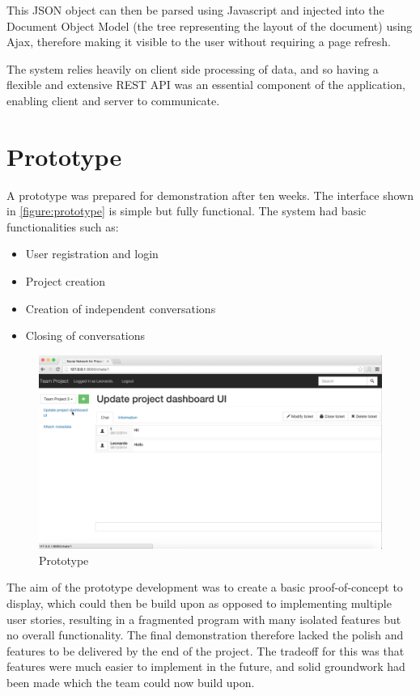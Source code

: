\documentclass[a4paper]{l3proj}
\begin{document}
This JSON object can then be parsed using Javascript and injected into the Document Object Model (the tree representing the layout of the document) using Ajax, therefore making it visible to the user without requiring a page refresh.

The system relies heavily on client side processing of data, and so having a flexible and extensive REST API was an essential component of the application, enabling client and server to communicate.
\section{Prototype}
\label{prototype}


A prototype was prepared for demonstration after ten weeks. The interface shown in \autoref{figure:prototype} is simple but fully functional. The system had basic functionalities such as: 

\begin{itemize}
\item User registration and login
\item Project creation
\item Creation of independent conversations
\item Closing of conversations
\end{itemize}

\begin{figure}[ht]
\centering
\includegraphics[scale=0.3]{prototype}
\caption{Prototype}
\label{figure:prototype}
\end{figure}

The aim of the prototype development was to create a basic proof-of-concept to display, which could then be build upon as opposed to implementing multiple user stories, resulting in a fragmented program with many isolated features but no overall functionality.  The final demonstration therefore lacked the polish and features to be delivered by the end of the project. The tradeoff for this was that features were much easier to implement in the future, and solid groundwork had been made which the team could now build upon. 
\end{document}
